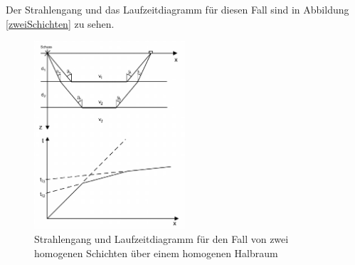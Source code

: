 Der Strahlengang und das Laufzeitdiagramm für diesen Fall sind in Abbildung \ref{zweiSchichten} zu sehen.

\begin{figure}
 \centering
 \includegraphics[width=0.5\textwidth]{fig/zweischichten}
 \caption[Strahlengang und Laufzeitdiagramm für den Fall von zwei homogenen Schichten über einem homogenen Halbraum]{Strahlengang und Laufzeitdiagramm für den Fall von zwei homogenen Schichten über einem homogenen Halbraum \cite{skript}}
 \label{fig:zweiSchichten}
\end{figure}

